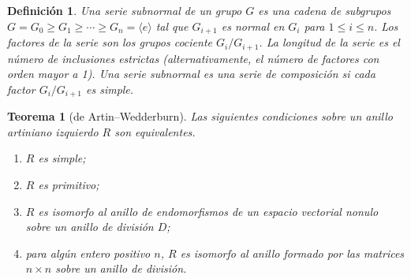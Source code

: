 \documentclass{report}
\newtheorem{theorem}{Teorema}
\newtheorem{definition}{Definición}
\begin{document}
  \begin{definition}
    Una \emph{serie subnormal} de un grupo \(G\) es una cadena de subgrupos \(G = G_0 \geq G_1 \geq \cdots \geq G_n = \langle e \rangle\) tal que \(G_{i + 1}\) es normal en \(G_i\) para \(1 \leq i \leq n\).
    Los \emph{factores} de la serie son los grupos cociente \(G_i / G_{i + 1}\).
    La \emph{longitud} de la serie es el número de inclusiones estrictas (alternativamente, el número de factores con orden mayor a 1).
    Una serie subnormal es una \emph{serie de composición} si cada factor \(G_i / G_{i + 1}\) es simple.
  \end{definition}

  \begin{theorem}[de Artin--Wedderburn]
    Las siguientes condiciones sobre un anillo artiniano izquierdo \(R\) son equivalentes.
    \begin{enumerate}
      \item
        \label{property:artin--wedderburn_simple-ring}
        \(R\) es simple;
      \item
        \label{property:artin--wedderburn_primitive-ring}
        \(R\) es primitivo;
      \item
        \label{property:artin--wedderburn_endomorphism-ring}
        \(R\) es isomorfo al anillo de endomorfismos de un espacio vectorial nonulo sobre un anillo de división \(D\);
      \item
        \label{property:artin--wedderburn_matrix-ring}
        para algún entero positivo \(n\), \(R\) es isomorfo al anillo formado por las matrices \(n \times n\) sobre un anillo de división.
    \end{enumerate}
  \end{theorem}
\end{document}
